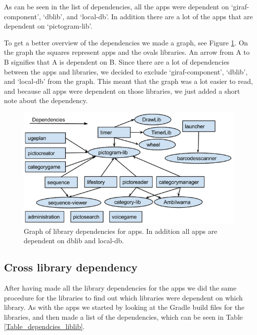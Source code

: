 As can be seen in the list of dependencies, all the apps were dependent on ‘giraf-component’, ‘dblib’, and ‘local-db’. In addition there are a lot of the apps that are dependent on ‘pictogram-lib’.

To get a better overview of the dependencies we made a graph, see Figure \ref{AppLibependencies}. On the graph the squares represent apps and the ovals libraries. An arrow from A to B signifies that A is dependent on B. Since there are a lot of dependencies between the apps and libraries, we decided to exclude ‘giraf-component’, ‘dblib’, and ‘local-db’ from the graph. This meant that the graph was a lot easier to read, and because all apps were dependent on those libraries, we just added a short note about the dependency.


\begin{figure}[H]
	\centering
	\includegraphics[width=0.8 \textwidth]{pictures/AppLibependencies.png}
	\caption{Graph of library dependencies for apps. In addition all apps are dependent on dblib and local-db.}
	\label{AppLibependencies}
\end{figure}


\subsection{Cross library dependency}
After having made all the library dependencies for the apps we did the same procedure for the libraries to find out which libraries were dependent on which library. As with the apps we started by looking at the Gradle build files for the libraries, and then made a list of the dependencies, which can be seen in Table \ref{Table_dependcies_liblib}.

